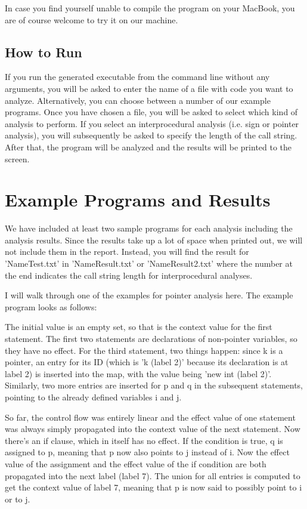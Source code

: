 \documentclass[a4paper,11pt]{article}
\begin{document}
In case you find yourself unable to compile the program on your MacBook, you are of course welcome to try it on our machine.

\subsection{How to Run}
If you run the generated executable from the command line without any arguments, you will be asked to enter the name of a file with code you want to analyze. Alternatively, you can choose between a number of our example programs. Once you have chosen a file, you will be asked to select which kind of analysis to perform. If you select an interprocedural analysis (i.e. sign or pointer analysis), you will subsequently be asked to specify the length of the call string. After that, the program will be analyzed and the results will be printed to the screen.

\section{Example Programs and Results}
We have included at least two sample programs for each analysis including the analysis results. Since the results take up a lot of space when printed out, we will not include them in the report. Instead, you will find the result for 'NameTest.txt' in 'NameResult.txt' or 'NameResult2.txt' where the number at the end indicates the call string length for interprocedural analyses.

I will walk through one of the examples for pointer analysis here. The example program looks as follows:



The initial value is an empty set, so that is the context value for the first statement. The first two statements are declarations of non-pointer variables, so they have no effect. For the third statement, two things happen: since k is a pointer, an entry for its ID (which is 'k (label 2)' because its declaration is at label 2) is inserted into the map, with the value being 'new int (label 2)'. Similarly, two more entries are inserted for p and q in the subsequent statements, pointing to the already defined variables i and j.

So far, the control flow was entirely linear and the effect value of one statement was always simply propagated into the context value of the next statement. Now there's an if clause, which in itself has no effect. If the condition is true, q is assigned to p, meaning that p now also points to j instead of i. Now the effect value of the assignment and the effect value of the if condition are both propagated into the next label (label 7). The union for all entries is computed to get the context value of label 7, meaning that p is now said to possibly point to i or to j.
\end{document}
